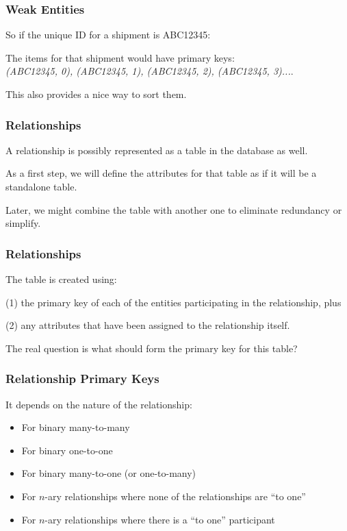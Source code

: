 \begin{frame}
\frametitle{Weak Entities}


So if the unique ID for a shipment is ABC12345:

The items for that shipment would have primary keys:\\
\quad \textit{(ABC12345, 0), (ABC12345, 1), (ABC12345, 2), (ABC12345, 3)...}. 

This also provides a nice way to sort them.

\end{frame}



\begin{frame}
\frametitle{Relationships}

A relationship is possibly represented as a table in the database as well. 

As a first step, we will define the attributes for that table as if it will be a standalone table. 

Later, we might combine the table with another one to eliminate redundancy or simplify.


\end{frame}



\begin{frame}
\frametitle{Relationships}

The table is created using:


(1) the primary key of each of the entities participating in the relationship, plus 

(2) any attributes that have been assigned to the relationship itself. 

The real question is what should form the primary key for this table?

\end{frame}


\begin{frame}
\frametitle{Relationship Primary Keys}

It depends on the nature of the relationship:

\begin{itemize}
	\item For binary many-to-many
	\item For binary one-to-one	
	\item For binary many-to-one (or one-to-many)
	\item For $n$-ary relationships where none of the relationships are ``to one''	
	\item For $n$-ary relationships where there is a ``to one'' participant
\end{itemize}

\end{frame}



